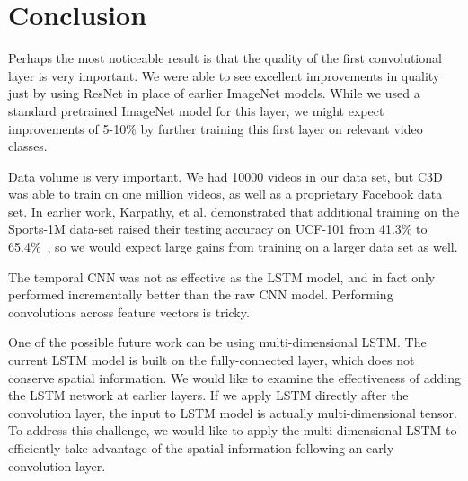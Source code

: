 \section{Conclusion}
Perhaps the most noticeable result is that the quality of the first convolutional layer is very important. We were able to see excellent improvements in quality just by using ResNet in place of earlier ImageNet models. While we used a standard pretrained ImageNet model for this layer, we might expect improvements of 5-10\% by further training this first layer on relevant video classes. 

Data volume is very important. We had 10000 videos in our data set, but C3D was able to train on one million videos, as well as a proprietary Facebook data set. In earlier work, Karpathy, et al. demonstrated that additional training on the Sports-1M data-set raised their testing accuracy on UCF-101 from 41.3\% to 65.4\%~\cite{cnnvid}, so we would expect large gains from training on a larger data set as well.

The temporal CNN was not as effective as the LSTM model, and in fact only performed incrementally better than the raw CNN model. Performing convolutions across feature vectors is tricky. 

One of the possible future work can be using multi-dimensional LSTM. The current LSTM model is built on the fully-connected layer, which does not conserve spatial information. We would like to examine the effectiveness of adding the LSTM network at earlier layers. If we apply LSTM directly after the convolution layer, the input to LSTM model is actually multi-dimensional tensor. To address this challenge, we would like to apply the multi-dimensional LSTM
\cite{byeon2015scene} to efficiently take advantage of the spatial information following an early convolution layer. 
